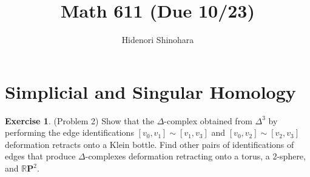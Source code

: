 \documentclass[12pt, psamsfonts]{amsart}
\theoremstyle{definition}
\newtheorem*{exer}{Exercise}
\theoremstyle{remark}
\numberwithin{equation}{section}
\begin{document}
\title{Math 611 (Due 10/23)}
\author{Hidenori Shinohara}
\maketitle

\section{Simplicial and Singular Homology}

\begin{exer}{(Problem 2)}
  Show that the $\Delta$-complex obtained from $\Delta^3$ by performing the edge identifications $[v_0, v_1] \sim [v_1, v_3]$ and $[v_0, v_2] \sim [v_2, v_3]$ deformation retracts onto a Klein bottle.
  Find other pairs of identifications of edges that produce $\Delta$-complexes deformation retracting onto a torus, a 2-sphere, and $\mathbb{R}\mathbf{P}^2$.
\end{exer}
\end{document}
